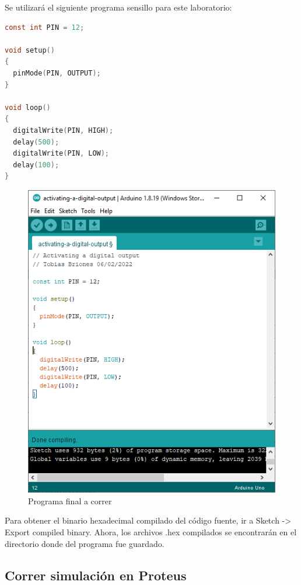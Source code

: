 \documentclass{article}
\begin{document}
\bigbreak

Se utilizará el siguiente programa sensillo para este laboratorio:

\begin{lstlisting}[language=C, caption=Programa para activar una salida digital]
const int PIN = 12;

void setup() 
{
  pinMode(PIN, OUTPUT);
}

void loop() 
{
  digitalWrite(PIN, HIGH);
  delay(500);
  digitalWrite(PIN, LOW);
  delay(100);
}
\end{lstlisting}

\begin{figure}[H]
    \centering
    \includegraphics[width=0.5\paperwidth]{images/arduino-2.png}
    \caption{Programa final a correr}
\end{figure}

Para obtener el binario hexadecimal compilado del código fuente, ir a Sketch -> Export compiled binary. 
Ahora, los archivos .hex compilados se encontrarán en el directorio donde del programa fue guardado.

\subsection{Correr simulación en Proteus}
\end{document}

